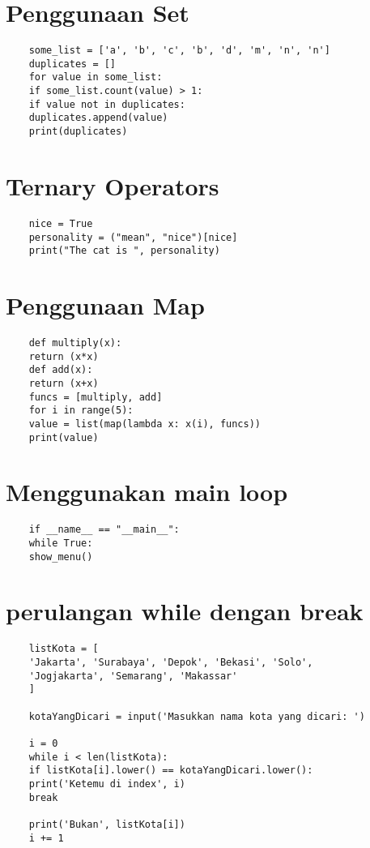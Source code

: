 \documentclass[12pt]{article} %
\begin{document}
\section {Penggunaan Set }
\begin{lstlisting}
	some_list = ['a', 'b', 'c', 'b', 'd', 'm', 'n', 'n']
	duplicates = []
	for value in some_list:
	if some_list.count(value) > 1:
	if value not in duplicates:
	duplicates.append(value)
	print(duplicates)
\end{lstlisting}

\section {Ternary Operators }
\begin{lstlisting}
	nice = True
	personality = ("mean", "nice")[nice]
	print("The cat is ", personality)
\end{lstlisting}

\section {Penggunaan Map}
\begin{lstlisting}
	def multiply(x):
	return (x*x)
	def add(x):
	return (x+x)
	funcs = [multiply, add]
	for i in range(5):
	value = list(map(lambda x: x(i), funcs))
	print(value)
\end{lstlisting}

\section{Menggunakan main loop}
\begin{lstlisting}
	if __name__ == "__main__":
	while True:
	show_menu()
\end{lstlisting}

\section {perulangan while dengan break}
\begin{lstlisting}
	listKota = [
	'Jakarta', 'Surabaya', 'Depok', 'Bekasi', 'Solo',
	'Jogjakarta', 'Semarang', 'Makassar'
	]
	
	kotaYangDicari = input('Masukkan nama kota yang dicari: ')
	
	i = 0
	while i < len(listKota):
	if listKota[i].lower() == kotaYangDicari.lower():
	print('Ketemu di index', i)
	break
	
	print('Bukan', listKota[i])
	i += 1
	
\end{lstlisting}
\end{document}
